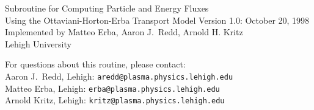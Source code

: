 %

\headheight 0pt \headsep 0pt  \topmargin 0pt  \oddsidemargin 0pt
\textheight 9.0in \textwidth 6.5in


\begin{center}
{\LARGE Subroutine for Computing Particle and Energy Fluxes\\ \vskip8pt
Using the Ottaviani-Horton-Erba Transport Model}\vskip1.0cm
Version 1.0: October 20, 1998 \\ 
Implemented by Matteo Erba, Aaron J.~Redd, Arnold H. Kritz\\
 Lehigh University
\end{center}
For questions about this routine, please contact: \\
Aaron J.~Redd, Lehigh:  {\tt aredd@plasma.physics.lehigh.edu} \\
Matteo Erba, Lehigh:  {\tt erba@plasma.physics.lehigh.edu}\\
Arnold Kritz, Lehigh: {\tt kritz@plasma.physics.lehigh.edu}


